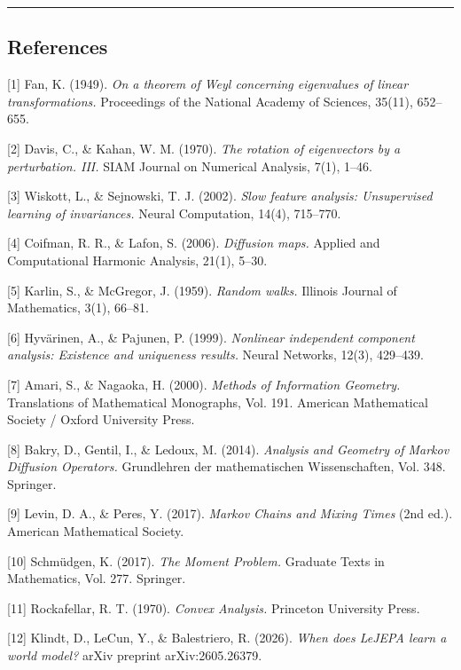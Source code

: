 \documentclass[
  letterpaper,
  11pt]{article}
\theoremstyle{plain}
\theoremstyle{definition}
\theoremstyle{remark}
\begin{document}
\begin{center}\rule{0.5\linewidth}{0.5pt}\end{center}

\subsection{References}\label{sec:references}

{[}1{]} Fan, K. (1949). \emph{On a theorem of Weyl concerning eigenvalues of linear transformations.} Proceedings of the National Academy of Sciences, 35(11), 652--655.

{[}2{]} Davis, C., \& Kahan, W. M. (1970). \emph{The rotation of eigenvectors by a perturbation. III.} SIAM Journal on Numerical Analysis, 7(1), 1--46.

{[}3{]} Wiskott, L., \& Sejnowski, T. J. (2002). \emph{Slow feature analysis: Unsupervised learning of invariances.} Neural Computation, 14(4), 715--770.

{[}4{]} Coifman, R. R., \& Lafon, S. (2006). \emph{Diffusion maps.} Applied and Computational Harmonic Analysis, 21(1), 5--30.

{[}5{]} Karlin, S., \& McGregor, J. (1959). \emph{Random walks.} Illinois Journal of Mathematics, 3(1), 66--81.

{[}6{]} Hyvärinen, A., \& Pajunen, P. (1999). \emph{Nonlinear independent component analysis: Existence and uniqueness results.} Neural Networks, 12(3), 429--439.

{[}7{]} Amari, S., \& Nagaoka, H. (2000). \emph{Methods of Information Geometry.} Translations of Mathematical Monographs, Vol. 191. American Mathematical Society / Oxford University Press.

{[}8{]} Bakry, D., Gentil, I., \& Ledoux, M. (2014). \emph{Analysis and Geometry of Markov Diffusion Operators.} Grundlehren der mathematischen Wissenschaften, Vol. 348. Springer.

{[}9{]} Levin, D. A., \& Peres, Y. (2017). \emph{Markov Chains and Mixing Times} (2nd ed.). American Mathematical Society.

{[}10{]} Schmüdgen, K. (2017). \emph{The Moment Problem.} Graduate Texts in Mathematics, Vol. 277. Springer.

{[}11{]} Rockafellar, R. T. (1970). \emph{Convex Analysis.} Princeton University Press.

{[}12{]} Klindt, D., LeCun, Y., \& Balestriero, R. (2026). \emph{When does LeJEPA learn a world model?} arXiv preprint arXiv:2605.26379.
\end{document}

